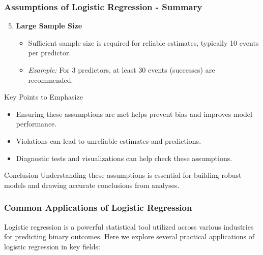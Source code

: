 \documentclass[aspectratio=169]{beamer}
\begin{document}
\begin{frame}[fragile]
    \frametitle{Assumptions of Logistic Regression - Summary}
    \begin{enumerate}
        \setcounter{enumi}{4} %
        \item \textbf{Large Sample Size}
            \begin{itemize}
                \item Sufficient sample size is required for reliable estimates, typically 10 events per predictor.
                \item \textit{Example:} For 3 predictors, at least 30 events (successes) are recommended.
            \end{itemize}
    \end{enumerate}
    
    \begin{block}{Key Points to Emphasize}
        \begin{itemize}
            \item Ensuring these assumptions are met helps prevent bias and improves model performance.
            \item Violations can lead to unreliable estimates and predictions.
            \item Diagnostic tests and visualizations can help check these assumptions.
        \end{itemize}
    \end{block}

    \begin{block}{Conclusion}
        Understanding these assumptions is essential for building robust models and drawing accurate conclusions from analyses.
    \end{block}
\end{frame}

\begin{frame}[fragile]
    \frametitle{Common Applications of Logistic Regression}
    Logistic regression is a powerful statistical tool utilized across various industries for predicting binary outcomes. Here we explore several practical applications of logistic regression in key fields:
\end{frame}
\end{document}
